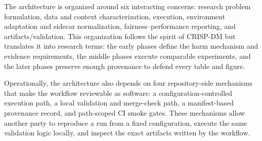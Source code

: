 \documentclass{IEEEtran}
\begin{document}
The architecture is organized around six interacting concerns: research problem formulation, data and context characterization, execution, environment adaptation and sidecar normalization, fairness--performance reporting, and artifacts/validation. This organization follows the spirit of CRISP-DM but translates it into research terms: the early phases define the harm mechanism and evidence requirements, the middle phases execute comparable experiments, and the later phases preserve enough provenance to defend every table and figure.

Operationally, the architecture also depends on four repository-side mechanisms that make the workflow reviewable as software: a configuration-controlled execution path, a local validation and merge-check path, a manifest-based provenance record, and path-scoped CI smoke gates. These mechanisms allow another party to reproduce a run from a fixed configuration, execute the same validation logic locally, and inspect the exact artifacts written by the workflow.
\end{document}
